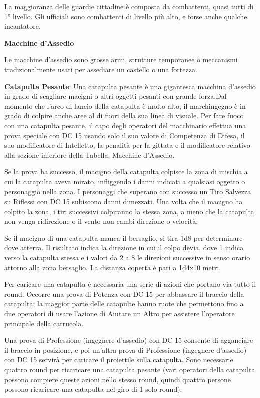 \documentclass[a4paper,11pt,twoside,openany]{book}
\begin{document}
La maggioranza delle guardie cittadine è composta da combattenti, quasi tutti di 1° livello. Gli ufficiali sono combattenti di livello più alto, e forse anche qualche incantatore.

\textbf{Macchine d'Assedio}

Le macchine d'assedio sono grosse armi, strutture temporanee o meccanismi tradizionalmente usati per assediare un castello o una fortezza.

\textbf{Catapulta Pesante}: Una catapulta pesante è una gigantesca macchina d'assedio in grado di scagliare macigni o altri oggetti pesanti con grande forza.Dal momento che l'arco di lancio della catapulta è molto alto, il marchingegno è in grado di colpire anche aree al di fuori della sua linea di visuale. Per fare fuoco con una catapulta pesante, il capo degli operatori del macchinario effettua una prova speciale con DC 15 usando solo il suo valore di Competenza di Difesa, il suo modificatore di Intelletto, la penalità per la gittata e il modificatore relativo alla sezione inferiore della Tabella: Macchine d'Assedio.

Se la prova ha successo, il macigno della catapulta colpisce la zona di mischia a cui la catapulta aveva mirato, infliggendo i danni indicati a qualsiasi oggetto o personaggio nella zona. I personaggi che superano con successo un Tiro Salvezza su Riflessi con DC 15 subiscono danni dimezzati. Una volta che il macigno ha colpito la zona, i tiri successivi colpiranno la stessa zona, a meno che la catapulta non venga ridirezione o il vento non cambi direzione o velocità.

Se il macigno di una catapulta manca il bersaglio, si tira 1d8 per determinare dove atterra. Il risultato indica la direzione in cui il colpo devia, dove 1 indica verso la catapulta stessa e i valori da 2 a 8 le direzioni successive in senso orario attorno alla zona bersaglio. La distanza coperta è pari a 1d4x10 metri.

Per caricare una catapulta è necessaria una serie di azioni che portano via tutto il round. Occorre una prova di Potenza con DC 15 per abbassare il braccio della catapulta; la maggior parte delle catapulte hanno ruote che permettono fino a due operatori di usare l'azione di Aiutare un Altro per assistere l'operatore principale della carrucola.

Una prova di Professione (ingegnere d'assedio) con DC 15 consente di agganciare il braccio in posizione, e poi un'altra prova di Professione (ingegnere d'assedio) con DC 15 servirà per caricare il proiettile sulla catapulta. Sono necessarie quattro round per ricaricare una catapulta pesante (vari operatori della catapulta possono compiere queste azioni nello stesso round, quindi quattro persone possono ricaricare una catapulta nel giro di 1 solo round).
\end{document}
